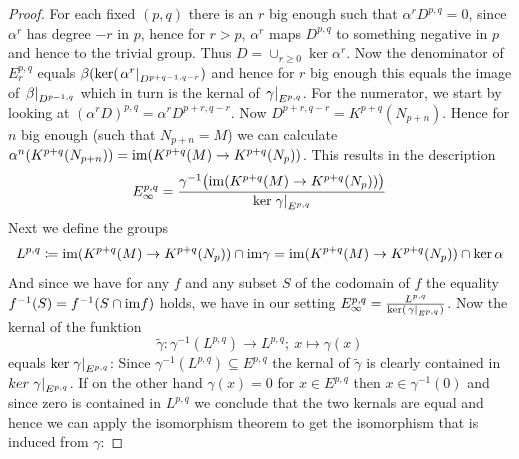 \begin{proof}
	For each fixed $(p,q)$ there is an $r$ big enough such that $\alpha^r D^{p,q}=0$, since $\alpha^r$ has degree $-r$ in $p$, hence for $r>p$, $\alpha^r$ maps $D^{p,q}$ to something negative in $p$ and hence to the trivial group.
	Thus $D=\cup_{r\geq 0}\ker \alpha^r$. Now the denominator of $E^{p,q}_r$ equals $\beta(\ker( \left.\alpha^r\right|_{D^{p+q-1,q-r}})$ and hence for $r$ big enough this equals the image of $\left.\beta\right|_{D^{p-1,q}}$ which in turn is the kernal of $\left.\gamma\right|_{E^{p,q}}$. For the numerator, we start by looking at $(\alpha^r D)^{p,q}=\alpha^rD^{p+r,q-r}$. Now $D^{p+r,q-r}=K^{p+q}(N_{p+n})$. Hence for $n$ big enough (such that $N_{p+n}=M$) we can calculate $\alpha^n(K^{p+q}(N_{p+n}))=\mathrm{im}(K^{p+q}(M)\to K^{p+q}(N_p))$. This results in the description
	\begin{equation*}
		E^{p,q}_\infty=\frac{\gamma^{-1}\big(\mathrm{im}(K^{p+q}(M)\to K^{p+q}(N_p))\big)}{\ker\left.\gamma\right|_{E^{p,q}}}
	\end{equation*}
	Next we define the groups
	\begin{equation*}
		L^{p,q}\coloneq \mathrm{im}(K^{p+q}(M)\to K^{p+q}(N_p)) \cap \mathrm{im} \gamma= \mathrm{im}(K^{p+q}(M)\to K^{p+q}(N_p)) \cap \ker \alpha
	\end{equation*}
	And since we have for any $f$ and any subset $S$ of the  codomain of $f$ the equality $f^{-1}(S)=f^{-1}(S\cap \mathrm{im} f)$ holds,
	we have in our setting $ E^{p,q}_\infty=\frac{L^{p,q}}{\ker(\left.\gamma\right|_{E^{p,q}})}$. Now the kernal of the funktion
	\begin{equation*}
		\tilde{\gamma}:\gamma^{-1} (L^{p,q})\to L^{p,q};~x\mapsto \gamma(x)
	\end{equation*} equals $\ker \left.\gamma\right|_{E^{p,q}}$: Since $\gamma^{-1} (L^{p,q})\subseteq E^{p,q}$ the kernal of  $\tilde{\gamma}$ is clearly contained in $ker \left.\gamma\right|_{E^{p,q}}$. If on the other hand $\gamma(x)=0$ for $x\in E^{p,q}$ then $x\in \gamma^{-1}(0)$ and since zero is contained in $L^{p,q}$ we conclude that the two kernals are equal and hence we can apply the isomorphism theorem to get the isomorphism that is induced from $\gamma$:
	

\end{proof}
